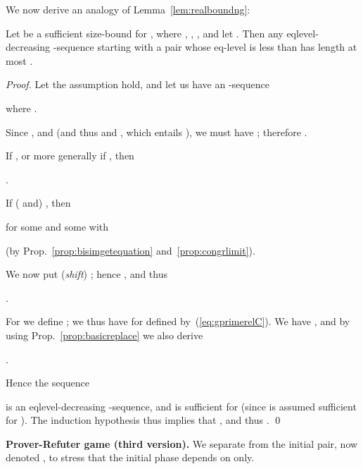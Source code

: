 \documentclass{llncs}
\begin{document}
We now derive an analogy of Lemma~\ref{lem:realboundng}:


\begin{lemma}\label{lem:boundng}
Let  be a sufficient size-bound for , 
where , ,
,
and let 
.
Then any
eqlevel-decreasing -sequence 
starting with a pair whose eq-level is less than 
 has length at most .
\end{lemma}

\begin{proof}
Let the assumption hold, and 
let us have an -sequence 
\begin{center}
 
where
.
\end{center}
Since , 
and 
(and thus  and
, which entails
),
we must have
; therefore
.

If , or more generally 
if , 
then 
\begin{center}
.
\end{center}
If ( and) , then 
\begin{center}
 
\end{center}
for some  and some  with 

(by Prop.~\ref{prop:bisimgetequation} and~\ref{prop:congrlimit}).

We now put (\emph{shift}) ;
hence , and thus
\begin{center}
.
\end{center}
For 
we define
;
we thus have   for
  defined by~(\ref{eq:gprimerelC}).
We have 
, and
by using Prop.~\ref{prop:basicreplace} we also derive
\begin{center}
.
\end{center}
Hence the sequence
\begin{center}

\end{center}
is an eqlevel-decreasing -sequence,
and  is sufficient for  (since  is assumed 
sufficient for ).
The induction hypothesis thus implies that
,
and thus .
\qed
\end{proof}

\textbf{Prover-Refuter game (third version).}
We separate
 from the initial pair, now denoted ,
to stress that the initial phase depends on  only.
\end{document}
